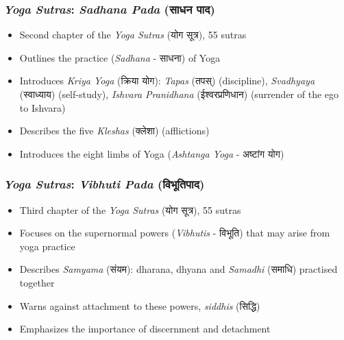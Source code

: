 \begin{frame}[fragile]\frametitle{\textit{Yoga Sutras}: \textit{Sadhana Pada} (साधन पाद)}

    \begin{itemize}
        \item Second chapter of the \textit{Yoga Sutras} (योग सूत्र), 55 sutras
        \item Outlines the practice (\textit{Sadhana} - साधना) of Yoga
        \item Introduces \textit{Kriya Yoga} (क्रिया योग): \textit{Tapas} (तपस्) (discipline), \textit{Svadhyaya} (स्वाध्याय) (self-study), \textit{Ishvara Pranidhana} (ईश्वरप्रणिधान) (surrender of the ego to Ishvara)
        \item Describes the five \textit{Kleshas} (क्लेशा) (afflictions)
        \item Introduces the eight limbs of Yoga (\textit{Ashtanga Yoga} - अष्टांग योग)
    \end{itemize}

\end{frame}

\begin{frame}[fragile]\frametitle{\textit{Yoga Sutras}: \textit{Vibhuti Pada} (विभूतिपाद)}

    \begin{itemize}
        \item Third chapter of the \textit{Yoga Sutras} (योग सूत्र), 55 sutras
        \item Focuses on the supernormal powers (\textit{Vibhutis} - विभूति) that may arise from yoga practice
        \item Describes \textit{Samyama} (संयम): dharana, dhyana and \textit{Samadhi} (समाधि) practised together
        \item Warns against attachment to these powers, \textit{siddhis} (सिद्धि)
        \item Emphasizes the importance of discernment and detachment
    \end{itemize}

\end{frame}


